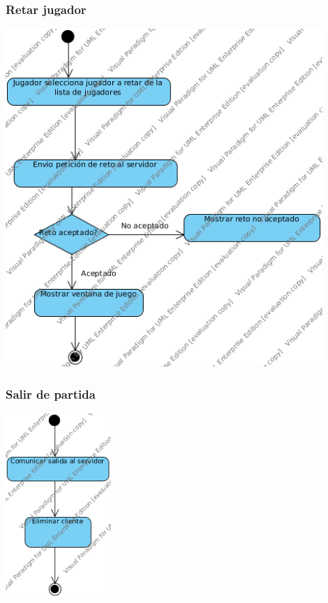 \documentclass[a4paper,11pt,oneside]{article}
\begin{document}
\subsubsection{Retar jugador}

\includegraphics[width=0.9\textwidth]{img/ms_RetarJugadorCliente.png}\\[1cm]

\subsubsection{Salir de partida}

\includegraphics[width=0.3\textwidth]{img/ms_SalirPartidaCliente.png}\\[1cm]
\end{document}
